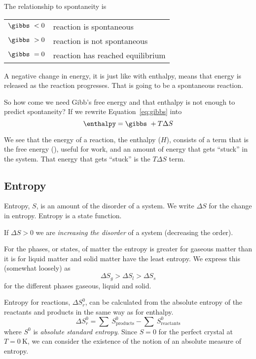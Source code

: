 \documentclass[../mit-general-chemistry.tex]{subfiles}
\begin{document}
The relationship to spontaneity is

\begin{center}
  \begin{tabular}{ll}
    $\gibbs\ < 0$ & reaction is spontaneous \\
    $\gibbs\ > 0$ & reaction is not spontaneous \\
    $\gibbs\ = 0$ & reaction has reached equilibrium  \\
  \end{tabular}
\end{center}


A negative change in energy, it is just like with enthalpy, means that
energy is released as the reaction progresses. That is going to be a
spontaneous reaction.


So how come we need Gibb's free energy and that enthalpy is not enough
to predict spontaneity? If we rewrite Equation~\ref{eq:gibbs} into
\begin{equation*}
  \enthalpy = \gibbs\ + T \Delta S
\end{equation*}

We see that the energy of a reaction, the enthalpy ($H$), consists of
a term that is the free energy (\gibbs), useful for work, and an
amount of energy that gets ``stuck'' in the system. That energy that
gets ``stuck'' is the $T \Delta S$ term.




\subsection{Entropy}


Entropy, $S$, is an amount of the disorder of a system. We write
$\Delta S$ for the change in entropy. Entropy is a state function.

If $\Delta S > 0$ we are {\em increasing the disorder} of a system
(decreasing the order).

For the phases, or states, of matter the entropy is greater for
gaseous matter than it is for liquid matter and solid matter have the
least entropy. We express this (somewhat loosely) as
\begin{equation*}
  \Delta S_g > \Delta S_l > \Delta S_s
\end{equation*}
for the different phases gaseous, liquid and solid.


Entropy for reactions, $\Delta S_r^0$, can be calculated from the
absolute entropy of the reactants and products in the same way as for
enthalpy.
\begin{equation*}
  \Delta S_r^0 = \sum~S^0_{\text{products}} - \sum~S^0_{\text{reactants}}
\end{equation*}
where $S^0$ is {\em absolute standard entropy}. Since $S = 0$ for the
perfect crystal at $T = \SI{0}{\kelvin}$, we can consider the
existence of the notion of an absolute measure of entropy.
\end{document}
